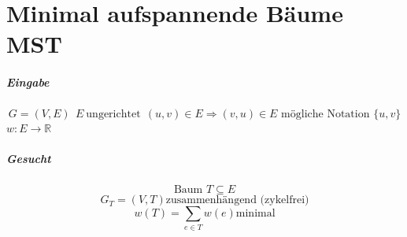 \chapter{Minimal aufspannende Bäume MST}	%
\paragraph{Eingabe}
\[ G=(V,E)~~E~\text{ungerichtet}~~(u,v)\in E \Rightarrow (v,u)\in E\text{ mögliche Notation } \{ u,v \} \]
$ w:E\rightarrow \mathbb{R}$
\paragraph{Gesucht}
\[ \text{Baum }T \subseteq E\]
\[ G_T=(V,T) \text{zusammenhängend (zykelfrei)} \]
\[ w(T) = \sum_{e\in T} w(e) \text{minimal} \]
